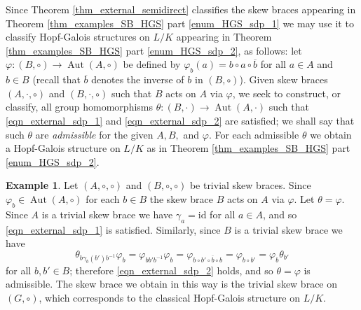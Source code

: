\documentclass[12pt,a4paper, reqno]{amsart}
\theoremstyle{definition}
\newtheorem{example}[theorem]{Example}
\renewcommand{\bar}{\overline}
\DeclareMathOperator{\Aut}{\mbox{Aut}}
\begin{document}
Since Theorem \ref{thm_external_semidirect} classifies the skew braces appearing in Theorem \ref{thm_examples_SB_HGS} part \ref{enum_HGS_sdp_1} we may use it to classify Hopf-Galois structures on $ L/K $ appearing in Theorem \ref{thm_examples_SB_HGS} part \ref{enum_HGS_sdp_2}, as follows: let $ \varphi : (B,\circ) \rightarrow \Aut(A,\circ) $ be defined by $ \varphi_{b}(a) = b \circ a \circ \bar{b} $ for all $ a \in A $ and $ b \in B $ (recall that $ \bar{b} $ denotes the inverse of $ b $ in $ (B,\circ) $). Given skew braces $ (A,\cdot,\circ) $ and $ (B,\cdot,\circ) $ such that $ B $ acts on $ A $ via $ \varphi $, we seek to construct, or classify, all group homomorphisms $ \theta : (B,\cdot) \rightarrow \Aut(A,\cdot) $ such that \eqref{eqn_external_sdp_1} and \eqref{eqn_external_sdp_2} are satisfied; we shall say that such $ \theta $ are \textit{admissible} for the given $ A,B, $ and $ \varphi $. For each admissible $ \theta $ we obtain a Hopf-Galois structure on $ L/K $ as in Theorem \ref{thm_examples_SB_HGS} part \ref{enum_HGS_sdp_2}. 

\begin{example} \label{eg_classical}
Let $ (A,\circ,\circ) $ and $ (B,\circ,\circ) $ be trivial skew braces. Since $ \varphi_{b} \in \Aut(A,\circ) $ for each $ b \in B $ the skew brace $ B $ acts on $ A $ via $ \varphi $. Let $ \theta = \varphi $. Since $ A $ is a trivial skew brace we have $ \gamma_{a} = \mathrm{id} $ for all $ a \in A $, and so \eqref{eqn_external_sdp_1} is satisfied. Similarly, since $ B $ is a trivial skew brace we have
\[ \theta_{b\gamma_{b}(b')b^{-1}} \varphi_{b} = \varphi_{bb'b^{-1}} \varphi_{b} = \varphi_{b \circ b' \circ \bar{b} \circ b} = \varphi_{b \circ b'} = \varphi_{b} \theta_{b'} \]
for all $ b,b' \in B $; therefore \eqref{eqn_external_sdp_2} holds, and so $ \theta = \varphi $ is admissible. The skew brace we obtain in this way is the trivial skew brace on $ (G,\circ) $, which corresponds to the classical Hopf-Galois structure on $ L/K $. 
\end{example}
\end{document}
